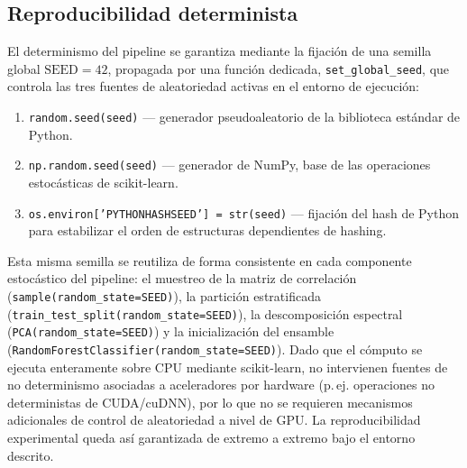 \subsection{Reproducibilidad determinista}
El determinismo del pipeline se garantiza mediante la fijación de una semilla
global $\text{SEED}=42$, propagada por una función dedicada,
\texttt{set\_global\_seed}, que controla las tres fuentes de aleatoriedad activas
en el entorno de ejecución:
\begin{enumerate}
\item \texttt{random.seed(seed)} --- generador pseudoaleatorio de la biblioteca
estándar de Python.
\item \texttt{np.random.seed(seed)} --- generador de NumPy, base de las
operaciones estocásticas de scikit-learn.
\item \texttt{os.environ['PYTHONHASHSEED'] = str(seed)} --- fijación del hash de
Python para estabilizar el orden de estructuras dependientes de hashing.
\end{enumerate}

Esta misma semilla se reutiliza de forma consistente en cada componente
estocástico del pipeline: el muestreo de la matriz de correlación
(\texttt{sample(random\_state=SEED)}), la partición estratificada
(\texttt{train\_test\_split(random\_state=SEED)}), la descomposición espectral
(\texttt{PCA(random\_state=SEED)}) y la inicialización del ensamble
(\texttt{RandomForestClassifier(random\_state=SEED)}). Dado que el cómputo se
ejecuta enteramente sobre CPU mediante scikit-learn, no intervienen fuentes de no
determinismo asociadas a aceleradores por hardware (p.\,ej. operaciones no
deterministas de CUDA/cuDNN), por lo que no se requieren mecanismos adicionales de
control de aleatoriedad a nivel de GPU. La reproducibilidad experimental queda así
garantizada de extremo a extremo bajo el entorno descrito.